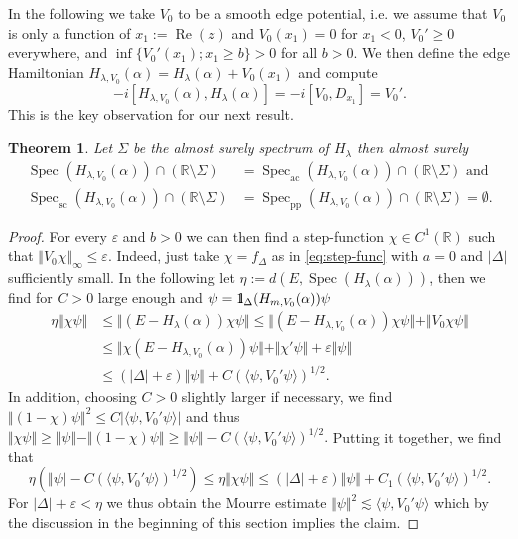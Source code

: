 \documentclass[reqno,12pt,letterpaper]{amsart}
\newcommand{\RR}{{\mathbb R}}
\newtheorem{theo}{Theorem}
\numberwithin{equation}{section}
\DeclareMathOperator{\Spec}{Spec}
\DeclareMathOperator{\Real}{Re}
\let\Re=\Real
\def\indic{\operatorname{1\hskip-2.75pt\relax l}}
\begin{document}
In the following we take $V_0$ to be a smooth edge potential, i.e. we assume that $V_0$ is only a function of $x_1:=\Re(z)$ and $V_0(x_1)=0$ for $x_1<0$, $V_0' \ge 0$ everywhere, and $\inf \{ V_0'(x_1); x_1 \ge b\} >0$ for all $b>0.$ 
We then define the edge Hamiltonian $H_{\lambda,V_0}(\alpha)= H_{\lambda}(\alpha) +  V_0(x_1)$ and compute
\[ -i [H_{\lambda,V_0}(\alpha),H_{\lambda}(\alpha)] =  -i[V_0,D_{x_1}] = V_0'.\]
This is the key observation for our next result.
\begin{theo}
\label{theo:acspec}
Let $\Sigma$ be the almost surely spectrum of $H_{\lambda}$ then almost surely 
\[\begin{split} \Spec(H_{\lambda,V_0}(\alpha)) \cap (\mathbb R \setminus \Sigma) &= \Spec_{\operatorname{ac}}(H_{\lambda,V_0}(\alpha)) \cap (\mathbb R \setminus \Sigma) \text{ and }\\
\Spec_{\operatorname{sc}}(H_{\lambda,V_0}(\alpha)) \cap (\mathbb R \setminus \Sigma) &= \Spec_{\operatorname{pp}}(H_{\lambda,V_0}(\alpha)) \cap (\mathbb R \setminus \Sigma)  = \emptyset.\end{split}\]
\end{theo}
\begin{proof}
For every $\varepsilon$ and $b>0$ we can then find a step-function $\chi \in C^{1}(\RR)$ such that $\Vert V_0 \chi \Vert_{\infty} \le \varepsilon$. Indeed, just take $\chi = f_{\Delta}$ as in \eqref{eq:step-func} with $a=0$ and $\vert \Delta \vert$ sufficiently small.
In the following let $\eta := d(E,\Spec(H_{\lambda}(\alpha)))$, then we find for $C>0$ large enough and $\psi = \indic_{\Delta}(H_{m,V_0}(\alpha))\psi$
\[\begin{split}
 \eta \Vert \chi \psi \Vert &\le \Vert (E-H_{\lambda}(\alpha))\chi \psi \Vert \le  \Vert (E-H_{\lambda,V_0}(\alpha))\chi \psi \Vert + \Vert V_0 \chi \psi \Vert \\
 &\le \Vert \chi(E-H_{\lambda,V_0}(\alpha)) \psi \Vert + \Vert \chi' \psi \Vert + \varepsilon \Vert \psi \Vert\\
 & \le (\vert \Delta \vert + \varepsilon) \Vert \psi \Vert + C (\langle \psi, V_0' \psi \rangle)^{1/2}.
 \end{split} \]
In addition, choosing $C>0$ slightly larger if necessary, we find  $\Vert (1-\chi)\psi \Vert^2 \le C \vert \langle \psi, V_0' \psi \rangle \vert$
and thus $\Vert \chi \psi \Vert \ge \Vert \psi \Vert - \Vert (1-\chi)\psi \Vert \ge \Vert \psi \Vert -C (\langle \psi, V_0' \psi \rangle)^{1/2}.$
Putting it together, we find that 
\[ \eta( \Vert \psi \vert -C (\langle \psi, V_0' \psi \rangle)^{1/2}) \le \eta \Vert \chi \psi \Vert \le (\vert \Delta \vert + \varepsilon) \Vert \psi \Vert + C_1 (\langle \psi, V_0' \psi \rangle)^{1/2}.\]
For $\vert \Delta \vert + \varepsilon <\eta$ we thus obtain the Mourre estimate $\Vert \psi \Vert^2 \lesssim \langle \psi, V_0' \psi \rangle$ which by the discussion in the beginning of this section implies the claim.
\end{proof}
\fi
\end{document}
